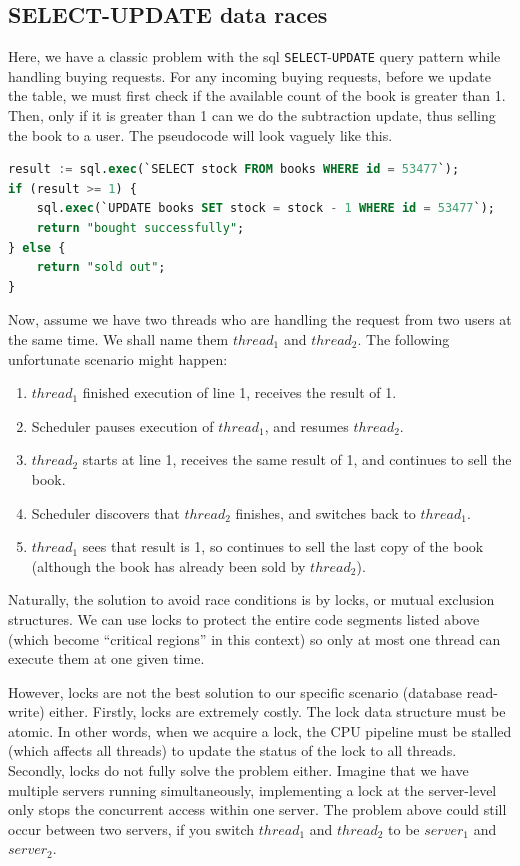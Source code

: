 \documentclass[letterpaper,11pt,twocolumn]{article}
\begin{document}
\subsection{SELECT-UPDATE data races}

Here, we have a classic problem with the sql \texttt{SELECT}-\texttt{UPDATE} query pattern while handling buying requests.
For any incoming buying requests, before we update the table, we must first check if the available count of the book is greater than 1. Then, only if it is greater than 1 can we do the subtraction update, thus selling the book to a user.
The pseudocode will look vaguely like this.
\begin{lstlisting}[language=sql,label=lst:use,caption={Psudocode for the buy handler.}]
result := sql.exec(`SELECT stock FROM books WHERE id = 53477`);
if (result >= 1) {
    sql.exec(`UPDATE books SET stock = stock - 1 WHERE id = 53477`);
    return "bought successfully";
} else {
    return "sold out";
}
\end{lstlisting}

Now, assume we have two threads who are handling the request from two users at the same time. We shall name them $thread_1$ and $thread_2$. 
The following unfortunate scenario might happen:
\begin{enumerate}
    \setlength{\itemsep}{0pt}
    \setlength{\parskip}{0pt}
    \item $thread_1$ finished execution of line 1, receives the result of 1.
    \item Scheduler pauses execution of $thread_1$, and resumes $thread_2$.
    \item $thread_2$ starts at line 1, receives the same result of 1, and continues to sell the book.
    \item Scheduler discovers that $thread_2$ finishes, and switches back to $thread_1$.
    \item $thread_1$ sees that result is 1, so continues to sell the last copy of the book (although the book has already been sold by $thread_2$).
\end{enumerate}

Naturally, the solution to avoid race conditions is by locks, or mutual exclusion structures. We can use locks to protect the entire code segments listed above (which become ``critical regions'' in this context) so only at most one thread can execute them at one given time.

However, locks are not the best solution to our specific scenario (database read-write) either.
Firstly, locks are extremely costly. The lock data structure must be atomic. In other words, when we acquire a lock, the CPU pipeline must be stalled (which affects all threads) to update the status of the lock to all threads. 
Secondly, locks do not fully solve the problem either. Imagine that we have multiple servers running simultaneously, implementing a lock at the server-level only stops the concurrent access within one server. The problem above could still occur between two servers, if you switch $thread_1$ and $thread_2$ to be $server_1$ and $server_2$.
\end{document}
